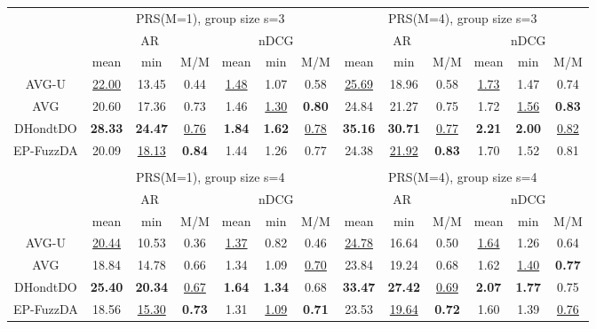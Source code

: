 \begin{tabular}{ c | c c c | c c c || c c c | c c c }

\multicolumn{1}{c}{} & \multicolumn{6}{c}{PRS(M=1), group size s=3} & \multicolumn{6}{c}{PRS(M=4), group size s=3} \\
\multicolumn{1}{c}{} & \multicolumn{3}{c}{AR} & \multicolumn{3}{c}{nDCG} & \multicolumn{3}{c}{AR} & \multicolumn{3}{c}{nDCG} \\
& mean & min & M/M & mean & min & M/M & mean & min & M/M & mean & min & M/M \\
\hline
AVG-U & \underline{22.00} & 13.45 & 0.44 & \underline{1.48} & 1.07 & 0.58 & \underline{25.69} & 18.96 & 0.58 & \underline{1.73} & 1.47 & 0.74 \\
AVG & 20.60 & 17.36 & 0.73 & 1.46 & \underline{1.30} & \textbf{0.80} & 24.84 & 21.27 & 0.75 & 1.72 & \underline{1.56} & \textbf{0.83} \\
DHondtDO & \textbf{28.33} & \textbf{24.47} & \underline{0.76} & \textbf{1.84} & \textbf{1.62} & \underline{0.78} & \textbf{35.16} & \textbf{30.71} & \underline{0.77} & \textbf{2.21} & \textbf{2.00} & \underline{0.82} \\
EP-FuzzDA & 20.09 & \underline{18.13} & \textbf{0.84} & 1.44 & 1.26 & 0.77 & 24.38 & \underline{21.92} & \textbf{0.83} & 1.70 & 1.52 & 0.81 \\

\multicolumn{12}{c}{} \\
\multicolumn{1}{c}{} & \multicolumn{6}{c}{PRS(M=1), group size s=4} & \multicolumn{6}{c}{PRS(M=4), group size s=4} \\
\multicolumn{1}{c}{} & \multicolumn{3}{c}{AR} & \multicolumn{3}{c}{nDCG} & \multicolumn{3}{c}{AR} & \multicolumn{3}{c}{nDCG} \\
& mean & min & M/M & mean & min & M/M & mean & min & M/M & mean & min & M/M \\
\hline
AVG-U & \underline{20.44} & 10.53 & 0.36 & \underline{1.37} & 0.82 & 0.46 & \underline{24.78} & 16.64 & 0.50 & \underline{1.64} & 1.26 & 0.64 \\
AVG & 18.84 & 14.78 & 0.66 & 1.34 & 1.09 & \underline{0.70} & 23.84 & 19.24 & 0.68 & 1.62 & \underline{1.40} & \textbf{0.77} \\
DHondtDO & \textbf{25.40} & \textbf{20.34} & \underline{0.67} & \textbf{1.64} & \textbf{1.34} & 0.68 & \textbf{33.47} & \textbf{27.42} & \underline{0.69} & \textbf{2.07} & \textbf{1.77} & 0.75 \\
EP-FuzzDA & 18.56 & \underline{15.30} & \textbf{0.73} & 1.31 & \underline{1.09} & \textbf{0.71} & 23.53 & \underline{19.64} & \textbf{0.72} & 1.60 & 1.39 & \underline{0.76} \\


\end{tabular}
